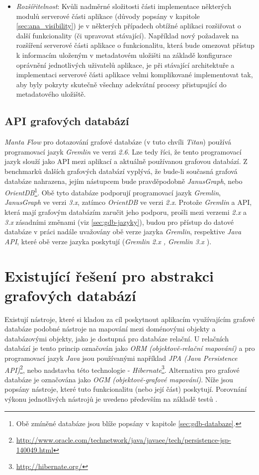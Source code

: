 \begin{itemize}
	\item{\textit{Rozšířitelnost}}: Kvůli nadměrné složitosti části implementace některých modulů serverové části aplikace (důvody popsány v kapitole \ref{sec:ana_visibility}) je v některých případech obtížné aplikaci rozšiřovat o další funkcionality (či upravovat stávající). Například nový požadavek na rozšíření serverové části aplikace o funkcionalitu, která bude omezovat přístup k informacím uloženým v metadatovém uložišti na základě konfigurace oprávnění jednotlivých uživatelů aplikace, je při stávající architektuře a implementaci serverové části aplikace velmi komplikované implementovat tak, aby byly pokryty skutečně všechny adekvátní procesy přistupující do metadatového uložiště.
\end{itemize}


\subsection{API grafových databází}
\label{sec:ana_gdbapi}
\textit{Manta Flow} pro dotazování grafové databáze (v tuto chvíli \textit{Titan}) používá programovací jazyk \textit{Gremlin} ve verzi \textit{2.6}. Lze tedy říci, že tento programovací jazyk slouží jako API mezi aplikací a aktuálně používanou grafovou databází. Z benchmarků dalších grafových databází \cite{Kovar18} vyplývá, že bude-li současná grafová databáze nahrazena, jejím nástupcem bude pravděpodobně \textit{JanusGraph}, nebo \textit{OrientDB}\footnote{Obě zmíněné databáze jsou blíže popsány v kapitole \ref{sec:gdb-databaze}.}. Obě tyto databáze podporují programovací jazyk \textit{Gremlin}, \textit{JanusGraph} ve verzi \textit{3.x}, zatímco \textit{OrientDB} ve verzi \textit{2.x}.
Protože \textit{Gremlin} a API, která mají grafovým databázím zaručit jeho podporu, prošli mezi verzemi \textit{2.x} a \textit{3.x} zásadními změnami (viz \ref{sec:gdb-jazyky}), budou pro přístup do datové databáze v práci nadále uvažovány obě verze jazyka \textit{Gremlin}, respektive \textit{Java API}, které obě verze jazyka poskytují (\textit{Gremlin 2.x \cite{Gremlin14}, Gremlin 3.x \cite{Gremlin17}}).

\section{Existující řešení pro abstrakci grafových databází}
\label{sec:ana_state_of_art}
Existují nástroje, které si kladou za cíl poskytnout aplikacím využívajícím grafové databáze podobné nástroje na mapování mezi doménovými objekty a databázovými objekty, jako je dostupná pro databáze relační. U relačních databází je tento princip označován jako \textit{ORM (objektově-relační mapování)} a pro programovací jazyk \textit{Java} jsou používanými například \textit{JPA (Java Persistence API)}\footnote{\url{http://www.oracle.com/technetwork/java/javaee/tech/persistence-jsp-140049.html}}, nebo nadstavba této technologie - \textit{Hibernate}\footnote{\url{http://hibernate.org/}}. Alternativa pro grafové databáze je označována jako \textit{OGM (objektově-grafové mapování)}. Níže jsou popsány nástroje, které tuto funkcionalitu (nebo její část) poskytují. Porovnání výkonu jednotlivých nástrojů je uvedeno především na základě testů \cite{FermaBenchmarks}.

